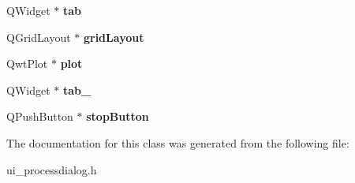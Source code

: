 \begin{DoxyCompactItemize}
\item 
\hypertarget{class_ui__process_dialog_a88018eaf7308f1e438e5fb3b461b66ee}{
QWidget $\ast$ {\bfseries tab}}
\label{class_ui__process_dialog_a88018eaf7308f1e438e5fb3b461b66ee}

\item 
\hypertarget{class_ui__process_dialog_ae4354dca860d721ac48a68e530931386}{
QGridLayout $\ast$ {\bfseries gridLayout}}
\label{class_ui__process_dialog_ae4354dca860d721ac48a68e530931386}

\item 
\hypertarget{class_ui__process_dialog_abf2e5008b182cbee2f4735a710a42f92}{
QwtPlot $\ast$ {\bfseries plot}}
\label{class_ui__process_dialog_abf2e5008b182cbee2f4735a710a42f92}

\item 
\hypertarget{class_ui__process_dialog_a81c8da6ac87cb40cf59830091014beac}{
QWidget $\ast$ {\bfseries tab\_}}
\label{class_ui__process_dialog_a81c8da6ac87cb40cf59830091014beac}

\item 
\hypertarget{class_ui__process_dialog_a2d8294d876cfc86f5a76784ce3c2897c}{
QPushButton $\ast$ {\bfseries stopButton}}
\label{class_ui__process_dialog_a2d8294d876cfc86f5a76784ce3c2897c}

\end{DoxyCompactItemize}


The documentation for this class was generated from the following file:\begin{DoxyCompactItemize}
\item 
ui\_\-processdialog.h\end{DoxyCompactItemize}

